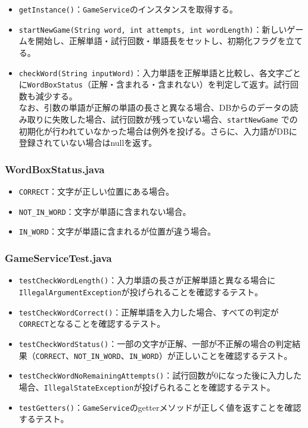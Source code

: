 \documentclass[a4j]{ujarticle}
\begin{document}
\begin{itemize}
  \item \texttt{getInstance()}：\texttt{GameService}のインスタンスを取得する。
  \item \texttt{startNewGame(String word, int attempts, int wordLength)}：新しいゲームを開始し、正解単語・試行回数・単語長をセットし、初期化フラグを立てる。
  \item \texttt{checkWord(String inputWord)}：入力単語を正解単語と比較し、各文字ごとに\texttt{WordBoxStatus}（正解・含まれる・含まれない）を判定して返す。試行回数も減少する。\\
  なお、引数の単語が正解の単語の長さと異なる場合、DBからのデータの読み取りに失敗した場合、試行回数が残っていない場合、\texttt{startNewGame} での初期化が行われていなかった場合は例外を投げる。さらに、入力語がDBに登録されていない場合はnullを返す。
\end{itemize}

\subsubsection{WordBoxStatus.java}

\begin{itemize}
  \item \texttt{CORRECT}：文字が正しい位置にある場合。
  \item \texttt{NOT\_IN\_WORD}：文字が単語に含まれない場合。
  \item \texttt{IN\_WORD}：文字が単語に含まれるが位置が違う場合。
\end{itemize}

\subsubsection{GameServiceTest.java}

\begin{itemize}
  \item \texttt{testCheckWordLength()}：入力単語の長さが正解単語と異なる場合に\texttt{IllegalArgumentException}が投げられることを確認するテスト。
  \item \texttt{testCheckWordCorrect()}：正解単語を入力した場合、すべての判定が\texttt{CORRECT}となることを確認するテスト。
  \item \texttt{testCheckWordStatus()}：一部の文字が正解、一部が不正解の場合の判定結果（\texttt{CORRECT}、\texttt{NOT\_IN\_WORD}、\texttt{IN\_WORD}）が正しいことを確認するテスト。
  \item \texttt{testCheckWordNoRemainingAttempts()}：試行回数が0になった後に入力した場合、\texttt{IllegalStateException}が投げられることを確認するテスト。
  \item \texttt{testGetters()}：\texttt{GameService}のgetterメソッドが正しく値を返すことを確認するテスト。
\end{itemize}
\end{document}
